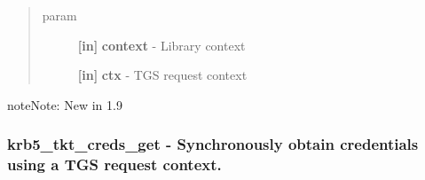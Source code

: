 \documentclass[letterpaper,10pt,english]{sphinxmanual}
\begin{document}
\begin{fulllineitems}
\label{appdev/refs/api/krb5_tkt_creds_free:c.krb5_tkt_creds_free}
\end{fulllineitems}

\begin{quote}\begin{description}
\item[{param}] \leavevmode
\textbf{{[}in{]}} \textbf{context} - Library context

\textbf{{[}in{]}} \textbf{ctx} - TGS request context

\end{description}\end{quote}

\begin{notice}{note}{Note:}
New in 1.9
\end{notice}


\subsubsection{krb5\_tkt\_creds\_get -  Synchronously obtain credentials using a TGS request context.}
\label{appdev/refs/api/krb5_tkt_creds_get:krb5-tkt-creds-get-synchronously-obtain-credentials-using-a-tgs-request-context}\label{appdev/refs/api/krb5_tkt_creds_get::doc}

\begin{fulllineitems}
\label{appdev/refs/api/krb5_tkt_creds_get:c.krb5_tkt_creds_get}
\end{fulllineitems}
\end{document}
